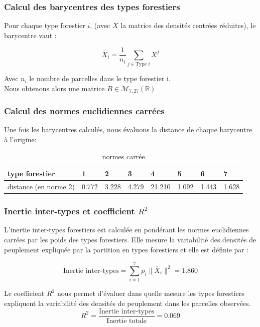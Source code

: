 \documentclass{article}
\begin{document}
\subsubsection{Calcul des barycentres des types forestiers}
Pour chaque type forestier $i$,  (avec $X$ la matrice des densités centrées réduites), le barycentre vaut :

\[
\bar{X}_i = \frac{1}{n_i} \sum_{j \in \text{Type } i} X^j
\]

Avec $n_i$ le nombre de parcelles dans le type forestier i.
\\
Nous obtenons alors une matrice $B \in \mathcal{M}_{7,27}(\mathbb{R})$


\subsubsection{Calcul des normes euclidiennes carrées}
Une fois les barycentres calculés, nous évaluons la distance de chaque barycentre à l'origine:

\begin{table}[H]
    \begin{tabular}{|l|l|l|l|l|l|l|l|}
    \hline
    type forestier       & 1         & 2         & 3         & 4      & 5     & 6     & 7     \\ \hline
    distance (en norme 2) & 0.772 & 3.228 & 4.279 & 21.210 & 1.092 & 1.443 & 1.628 \\ \hline
    \end{tabular}
    \caption{normes carrée}
    \end{table}

\subsubsection{Inertie inter-types et coefficient $R^2$}
\label{subsec : Inertie inter-types et coefficient}


L'inertie inter-types forestiers est calculée en pondérant les normes euclidiennes carrées par les poids des types forestiers. Elle mesure la variabilité des densités de peuplement expliquée par la partition en types forestiers et elle est définie par :

\[
\text{Inertie inter-types} = \sum_{i=1}^{7} p_i \|\bar{X}_i\|^2 = 1.860
\]

Le coefficient $R^2$ nous permet d'évaluer dans quelle mesure les types forestiers expliquent la variabilité des densités de peuplement dans les parcelles observées.
\[
R^2 = \frac{\text{Inertie inter-types}}{\text{Inertie totale}}=0.069
\]
\end{document}
